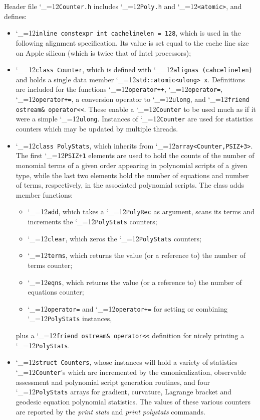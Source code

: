 \documentclass [12pt]{article}
\makeatletter
\renewcommand{\tt}{\begingroup\catcode`_=12\def\_{\string_}\tt@}
\newcommand{\tt@}[1]{\texttt{#1}\endgroup}
\makeatother
\begin{document}
Header file \tt{Counter.h} includes
\tt{Poly.h} and
\tt{<atomic>},
and defines:
\begin{itemize}
\item
    \tt{inline constexpr int cachelinelen = 128}, which
    is used in the following alignment specification.
    Its value is set equal to the
    cache line size on Apple silicon
    (which is twice that of Intel processors);

\item
    \tt{class Counter}, which is defined with
    \tt{alignas (cahcelinelen)} and holds a single
    data member \tt{std::atomic<ulong> x}.
    Definitions are included for the functions
    \tt{operator++},
    \tt{operator=},
    \tt{operator+=},
    a conversion operator to \tt{ulong},
    and \tt{friend ostream\& operator<<}.
    These enable a \tt{Counter} to be used much
    as if it were a simple \tt{ulong}.
    Instances of \tt{Counter} are used for
    statistics counters 
    which may be updated by multiple threads.

\item
    \tt{class PolyStats}, which inherits from 
    \tt{array<Counter,PSIZ+3>}.
    The first \tt{PSIZ+1} elements are used to hold
    the counts of the number of monomial terms of
    a given order appearing in polynomial scripts of a given type,
    while the last two elements hold the number of equations
    and number of terms, respectively, in the associated polynomial scripts.
    The class adds member functions:
    \begin{itemize}
    \item
	\tt{add}, which takes a \tt{PolyRec} as argument,
	scans its terms and increments the \tt{PolyStats} counters;
    \item
	\tt{clear}, which zeros the \tt{PolyStats} counters;
    \item
	\tt{terms}, which returns the value (or a reference to)
	the number of terms counter;
    \item
	\tt{eqns}, which returns the value (or a reference to)
	the number of equations counter;
    \item
	\tt{operator=} and \tt{operator+=} for setting or
	combining \tt{PolyStats} instances,
    \end{itemize}
    plus a \tt{friend ostream\& operator<<} definition
    for nicely printing a \tt{PolyStats}.

\item
    \tt{struct Counters}, whose instances will
    hold a variety of statistics \tt{Counter}'s
    which are incremented by the canonicalization, observable
    assessment and polynomial script generation routines,
    and four \tt{PolyStats} arrays for gradient,
    curvature, Lagrange bracket and geodesic equation
    polynomial statistics.
    The values of these various counters
    are reported by the \textit{print stats} and
    \textit{print polystats} commands.
\end{itemize}
\end{document}
